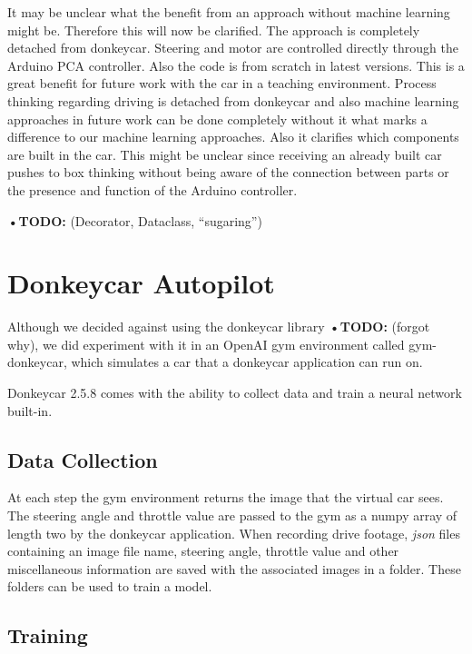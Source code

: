 \documentclass[conference]{IEEEtran}
\begin{document}
It may be unclear what the benefit from an approach without machine learning might be.
Therefore this will now be clarified.
The approach is completely detached from donkeycar.
Steering and motor are controlled directly through the Arduino PCA controller.
Also the code is from scratch in latest versions.
This is a great benefit for future work with the car in a teaching environment.
Process thinking regarding driving is detached from donkeycar and also machine learning approaches in future work can be done completely without it what marks a difference to our machine learning approaches.
Also it clarifies which components are built in the car.
This might be unclear since receiving an already built car pushes to box thinking without being aware of the connection between parts or the presence and function of the Arduino controller.

\textbf{•TODO:} (Decorator, Dataclass, "`sugaring"')

\section{Donkeycar Autopilot}

Although we decided against using the donkeycar library \textbf{•TODO:} (forgot why), we did experiment with it in an OpenAI gym environment called gym-donkeycar, which simulates a car that a donkeycar application can run on.

Donkeycar 2.5.8 comes with the ability to collect data and train a neural network built-in.

\subsection{Data Collection}

At each step the gym environment returns the image that the virtual car sees. 
The steering angle and throttle value are passed to the gym as a numpy array of length two by the donkeycar application. 
When recording drive footage, \textit{json} files containing an image file name, steering angle, throttle value and other miscellaneous information are saved with the associated images in a folder. 
These folders can be used to train a model.

\subsection{Training}
\end{document}
